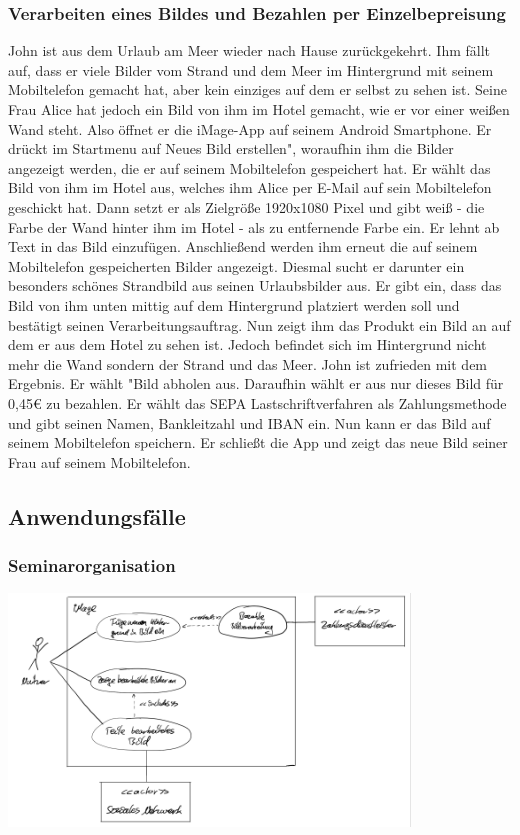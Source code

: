 \documentclass[parskip=full]{scrartcl}
\begin{document}
\subsubsection{Verarbeiten eines Bildes und Bezahlen per Einzelbepreisung}
John ist aus dem Urlaub am Meer wieder nach Hause zurückgekehrt. Ihm fällt auf, dass er viele Bilder vom Strand und dem Meer im Hintergrund mit seinem Mobiltelefon gemacht hat, aber kein einziges auf dem er selbst zu sehen ist. Seine Frau Alice hat jedoch ein Bild von ihm im Hotel gemacht, wie er vor einer weißen Wand steht. Also öffnet er die iMage-App auf seinem Android Smartphone. Er drückt im Startmenu auf \grqq{}Neues Bild erstellen", woraufhin ihm die Bilder angezeigt werden, die er auf seinem Mobiltelefon gespeichert hat. Er wählt das Bild von ihm im Hotel aus, welches ihm Alice per E-Mail auf sein Mobiltelefon geschickt hat. Dann setzt er als Zielgröße 1920x1080 Pixel und gibt weiß - die Farbe der Wand hinter ihm im Hotel - als zu entfernende Farbe ein. Er lehnt ab Text in das Bild einzufügen. Anschließend werden ihm erneut die auf seinem Mobiltelefon gespeicherten Bilder angezeigt. Diesmal sucht er darunter ein besonders schönes Strandbild aus seinen Urlaubsbilder aus. Er gibt ein, dass das Bild von ihm unten mittig auf dem Hintergrund platziert werden soll und bestätigt seinen Verarbeitungsauftrag. Nun zeigt ihm das Produkt ein Bild an auf dem er aus dem Hotel zu sehen ist. Jedoch befindet sich im Hintergrund nicht mehr die Wand sondern der Strand und das Meer. John ist zufrieden mit dem Ergebnis. Er wählt "Bild abholen\grqq{}  aus. Daraufhin wählt er aus nur dieses Bild für 0,45€ zu bezahlen. Er wählt das SEPA Lastschriftverfahren als Zahlungsmethode und gibt seinen Namen, Bankleitzahl und IBAN ein. Nun kann er das Bild auf seinem Mobiltelefon speichern. Er schließt die App und zeigt das neue Bild seiner Frau auf seinem Mobiltelefon.

\subsection{Anwendungsfälle}
\subsubsection{Seminarorganisation}
\begin{center}
\includegraphics[width=0.8\textwidth]{resources/anwendungsfalldiagramm.pdf}
\end{center}
\end{document}
